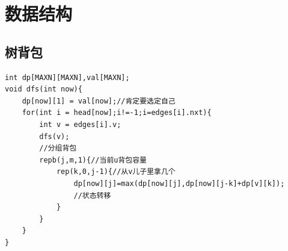 \documentclass[a4]{ctexart}
\begin{document}
\section{数据结构}

\subsection{树背包}
\begin{lstlisting}
int dp[MAXN][MAXN],val[MAXN];
void dfs(int now){
	dp[now][1] = val[now];//肯定要选定自己
	for(int i = head[now];i!=-1;i=edges[i].nxt){
		int v = edges[i].v;
		dfs(v);
		//分组背包
		repb(j,m,1){//当前u背包容量
			rep(k,0,j-1){//从v儿子里拿几个
				dp[now][j]=max(dp[now][j],dp[now][j-k]+dp[v][k]);
				//状态转移
			}
		}
	}
}
\end{lstlisting}
\end{document}
